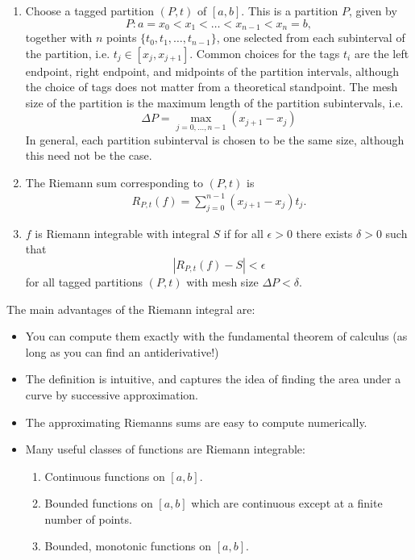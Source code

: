 \documentclass[12pt]{amsart}         %
\theoremstyle{remark}
\begin{document}
\begin{enumerate}
    \item Choose a tagged partition $(P, t)$ of $[a, b]$. This is a partition $P$, given by
    \[
    P: a = x_0 < x_1 < \dots < x_{n-1} < x_n = b,
    \]
    together with $n$ points $\{ t_0, t_1, \dots, t_{n-1} \}$, one selected from each subinterval of the partition, i.e. $t_j \in [x_j, x_{j+1}]$. Common choices for the tags $t_i$ are the left endpoint, right endpoint, and midpoints of the partition intervals, although the choice of tags does not matter from a theoretical standpoint. The mesh size of the partition is the maximum length of the partition subintervals, i.e.
    \[
    \Delta P = \max_{j = 0, \dots, n-1}(x_{j+1} - x_j)
    \]
    In general, each partition subinterval is chosen to be the same size, although this need not be the case.
    \item The Riemann sum corresponding to $(P, t)$ is    
    \begin{align*}
        R_{P,t}(f) = \sum_{j = 0}^{n-1} (x_{j+1} - x_j) t_j.
    \end{align*}
    \item $f$ is Riemann integrable with integral $S$ if for all $\epsilon > 0$ there exists $\delta > 0$ such that
    \[
    |R_{P, t}(f) - S| < \epsilon
    \]
    for all tagged partitions $(P, t)$ with mesh size $\Delta P < \delta$. 
\end{enumerate}

The main advantages of the Riemann integral are:

\begin{itemize}
    \item You can compute them exactly with the fundamental theorem of calculus (as long as you can find an antiderivative!)
    \item The definition is intuitive, and captures the idea of finding the area under a curve by successive approximation.
    \item The approximating Riemanns sums are easy to compute numerically.
    \item Many useful classes of functions are Riemann integrable:
    \begin{enumerate}
        \item Continuous functions on $[a, b]$.
        \item Bounded functions on $[a, b]$ which are continuous except at a finite number of points.
        \item Bounded, monotonic functions on $[a,b]$.
    \end{enumerate}
\end{itemize}
\end{document}
